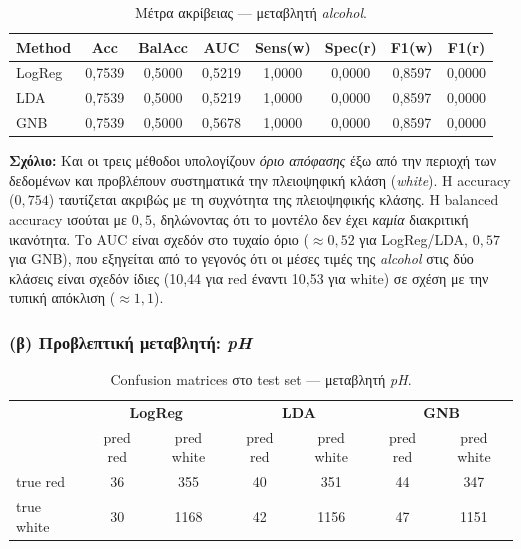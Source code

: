 \documentclass[11pt,a4paper]{article}
\begin{document}
\begin{table}[h!]
\centering
\caption{Μέτρα ακρίβειας — μεταβλητή \textit{alcohol}.}
\begin{tabular}{lccccccc}
\toprule
Method & Acc & BalAcc & AUC & Sens(w) & Spec(r) & F1(w) & F1(r) \\
\midrule
LogReg & 0,7539 & 0,5000 & 0,5219 & 1,0000 & 0,0000 & 0,8597 & 0,0000 \\
LDA    & 0,7539 & 0,5000 & 0,5219 & 1,0000 & 0,0000 & 0,8597 & 0,0000 \\
GNB    & 0,7539 & 0,5000 & 0,5678 & 1,0000 & 0,0000 & 0,8597 & 0,0000 \\
\bottomrule
\end{tabular}
\end{table}

\noindent
\textbf{Σχόλιο:} Και οι τρεις μέθοδοι υπολογίζουν \emph{όριο απόφασης} έξω
από την περιοχή των δεδομένων και προβλέπουν συστηματικά την πλειοψηφική
κλάση (\textit{white}). Η accuracy ($0{,}754$) ταυτίζεται ακριβώς με τη
συχνότητα της πλειοψηφικής κλάσης. Η balanced accuracy ισούται με $0{,}5$,
δηλώνοντας ότι το μοντέλο δεν έχει \emph{καμία} διακριτική ικανότητα.
Το AUC είναι σχεδόν στο τυχαίο όριο ($\approx 0{,}52$ για LogReg/LDA,
$0{,}57$ για GNB), που εξηγείται από
το γεγονός ότι οι μέσες τιμές της \textit{alcohol} στις δύο κλάσεις
είναι σχεδόν ίδιες (10,44 για red έναντι 10,53 για white) σε
σχέση με την τυπική απόκλιση ($\approx 1{,}1$).

\subsubsection*{(β) Προβλεπτική μεταβλητή: \textit{pH}}

\begin{table}[h!]
\centering
\caption{Confusion matrices στο test set — μεταβλητή \textit{pH}.}
\begin{tabular}{lcc|cc|cc}
\toprule
& \multicolumn{2}{c|}{\textbf{LogReg}} &
  \multicolumn{2}{c|}{\textbf{LDA}} &
  \multicolumn{2}{c}{\textbf{GNB}} \\
& pred red & pred white & pred red & pred white & pred red & pred white \\
\midrule
true red    & 36  & 355  & 40  & 351  & 44  & 347 \\
true white  & 30  & 1168 & 42  & 1156 & 47  & 1151 \\
\bottomrule
\end{tabular}
\end{table}
\end{document}
